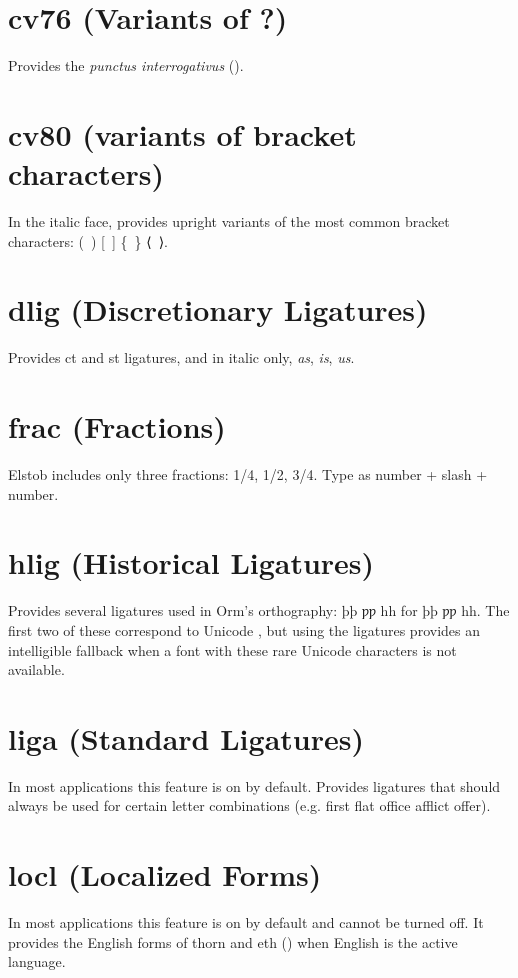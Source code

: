 \documentclass[12pt,letterpaper,openany]{book}
\begin{document}
\section{cv76 (Variants of ?)}
Provides the \textit{punctus interrogativus} ().

\section{cv80 (variants of bracket characters)}
In the italic face, provides upright variants of the most common bracket
characters: (\ ) [\ ] \{\ \} ⟨\ ⟩.

\section{dlig (Discretionary Ligatures)}
Provides { ct} and
{ st} ligatures, and in italic only,
{ \textit{as}, \textit{is}, \textit{us}}.

\section{frac (Fractions)}
Elstob includes only three fractions: { 1/4, 1/2,
3/4}. Type as number + slash + number.

\section{hlig (Historical Ligatures)}
Provides several ligatures used in Orm's orthography:
{ þþ ƿƿ hh} for
{þþ ƿƿ hh}. The first two of these correspond
to Unicode , but using the ligatures provides an intelligible
fallback when a font with these rare Unicode characters is not available.

\section{liga (Standard Ligatures)}
In most applications this feature is on by default.
Provides ligatures that should always be used for certain letter combinations
(e.g. first flat office afflict offer).

\section{locl (Localized Forms)}
In most applications this feature is on by default and cannot be turned off.
It provides the English forms of thorn and eth
() when English is the
active language.
\end{document}
